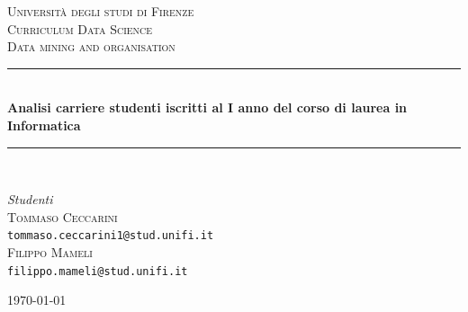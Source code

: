 \documentclass[12pt]{article}
\begin{document}
\begin{titlepage}
	\newcommand{\HRule}{\rule{\linewidth}{0.5mm}}

	\center
	
	\textsc{\LARGE Università degli studi di Firenze}\\[1.5cm] 
	
	\textsc{\Large Curriculum Data Science}\\[0.5cm] 
	
	\textsc{\large Data mining and organisation}\\[0.5cm] 

	\HRule\\[0.4cm]
	
	{\huge\bfseries Analisi carriere studenti iscritti al I anno del corso di laurea in Informatica}\\[0.4cm] %
	
	\HRule\\[1.5cm]
	\vfill\vfill\vfill 

	\begin{minipage}{\textwidth}
		\begin{flushright}
			\large
			\textit{Studenti}\\
			\textsc{Tommaso Ceccarini}\\
			\texttt{tommaso.ceccarini1@stud.unifi.it}\\
			\textsc{Filippo Mameli}\\
			\texttt{filippo.mameli@stud.unifi.it}
		\end{flushright}
	\end{minipage}
	
	\vfill
	
	{\large\today}
	
\end{titlepage}

\newpage

\tableofcontents

\newpage

\thispagestyle{empty}\clearpage\mbox{}\clearpage
\end{document}
